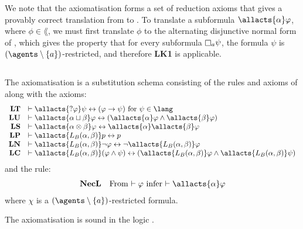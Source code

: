 We note that the axiomatisation \axiomAflKFF{} forms a set of reduction axioms that gives a provably correct translation from \langAfl{} to \lang{}.
To translate a subformula $\allacts{\alpha} \phi$, where $\phi \in \lang$, we must first translate $\phi$ to the alternating disjunctive normal form of \cite{hales:2012}, which gives the property that for every subformula $\necessary[\agentA] \psi$, the formula $\psi$ is $(\agents \setminus \{\agentA\})$-restricted, and therefore {\bf LK1} is applicable.

\subsection{\classS{}}

\begin{definition}\label{afl-s-axioms}
The axiomatisation \axiomAflS{} is a substitution schema consisting of the rules and axioms of \axiomS{} along with the axioms:
$$
\begin{array}{rl}
    {\bf LT} & \proves \allacts{\test{\phi}} \psi \iff (\phi \implies \psi) \text{ for } \psi \in \lang\\
    {\bf LU} & \proves \allacts{\alpha \choice \beta} \phi \iff (\allacts{\alpha} \phi \land \allacts{\beta} \phi)\\
    {\bf LS} & \proves \allacts{\alpha \compose \beta} \phi \iff \allacts{\alpha} \allacts{\beta} \phi\\
    {\bf LP} & \proves \allacts{\learns_\agentsB (\alpha, \beta)} \atomP \iff \atomP\\
    {\bf LN} & \proves \allacts{\learns_\agentsB (\alpha, \beta)} \neg \phi \iff \neg \allacts{\learns_\agentsB (\alpha, \beta)} \phi\\
    {\bf LC} & \proves \allacts{\learns_\agentsB (\alpha, \beta)} (\phi \land \psi) \iff (\allacts{\learns_\agentsB (\alpha, \beta)} \phi \land \allacts{\learns_\agentsB (\alpha, \beta)} \psi)\\
\end{array}
$$
and the rule:
$$
\begin{array}{rl}
    {\bf NecL} & \text{From $\proves \phi$ infer $\proves \allacts{\alpha} \phi$}
\end{array}
$$
where $\chi$ is a $(\agents \setminus \{\agentA\})$-restricted formula.
\end{definition}

\begin{proposition}\label{afl-s-axioms-soundness}
The axiomatisation \axiomAflS{} is sound in the logic \logicAmlS{}.
\end{proposition}

